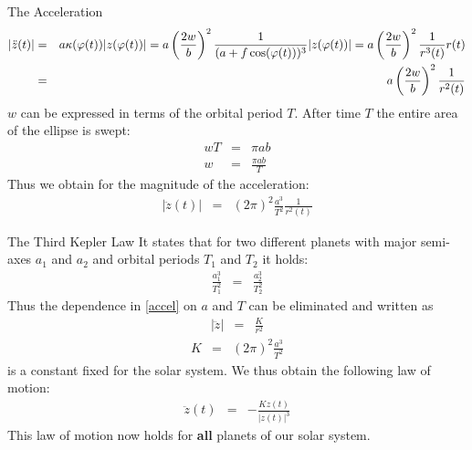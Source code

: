\begin{chapter}{\titlestr}
\begin{section}{The Acceleration}
\begin{eqnarray}
\label{ell_acc}
|\ddot{z}(t)| &=& a\kappa(\varphi(t))|z(\varphi(t))|=a\left(\frac{2w}{b}\right)^2\frac{1}{(a+f\cos(\varphi(t)))^3}|z(\varphi(t))|=a\left(\frac{2w}{b}\right)^2\frac{1}{r^3(t)}r(t)\cr
&=& a\left(\frac{2w}{b}\right)^2\frac{1}{r^2(t)}
\end{eqnarray}
$w$ can be expressed in terms of the orbital period $T$. After time $T$ the entire area of the ellipse is swept:
\begin{eqnarray*}
wT &=& \pi ab\\
w &=& \frac{\pi ab}{T}
\end{eqnarray*}
Thus we obtain for the magnitude of the acceleration:
\begin{eqnarray}
\label{accel}
|\ddot{z}(t)| &=& \left(2\pi\right)^2\frac{a^3}{T^2}\frac{1}{r^2(t)}
\end{eqnarray}
\end{section}

\begin{section}{The Third Kepler Law}
\label{ell_accel2}
It states that for two different planets with major semi-axes $a_1$ and $a_2$ and orbital periods $T_1$ and $T_2$ it holds:
\begin{eqnarray*}
\frac{a_1^3}{T_1^2} &=& \frac{a_2^3}{T_2^2}
\end{eqnarray*}
Thus the dependence in \ref{accel} on $a$ and $T$ can be eliminated and written as
\begin{eqnarray*}
|\ddot{z}| &=& \frac{K}{r^2}
\end{eqnarray*}
\begin{eqnarray}
\label{kdef}
K&=&\left(2\pi\right)^2\frac{a^3}{T^2}
\end{eqnarray}
is a constant fixed for the solar system. We thus obtain the following law of motion:
\begin{eqnarray}
\label{kepler_motion}
\ddot{z}(t) &=& -\frac{Kz(t)}{|z(t)|^3}
\end{eqnarray}
This law of motion now holds for \textbf{all} planets of our solar system.
\end{section}
\ifx\makebook\undefined
	
\else
	\end{chapter}
\fi